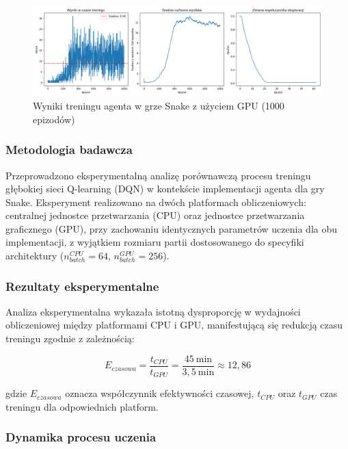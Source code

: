 \documentclass[a4paper,12pt]{article}
\begin{document}
  \begin{figure}[H]
    \centering
    \includegraphics[width=1\linewidth]{1000gierGPU.png}
    \caption{Wyniki treningu agenta w grze Snake z użyciem GPU (1000 epizodów)}
    \label{fig:wyniki_treningu_gpu}
\end{figure}



\subsubsection{Metodologia badawcza}

Przeprowadzono eksperymentalną analizę porównawczą procesu treningu głębokiej sieci Q-learning (DQN) w kontekście implementacji agenta dla gry Snake. Eksperyment realizowano na dwóch platformach obliczeniowych: centralnej jednostce przetwarzania (CPU) oraz jednostce przetwarzania graficznego (GPU), przy zachowaniu identycznych parametrów uczenia dla obu implementacji, z wyjątkiem rozmiaru partii dostosowanego do specyfiki architektury (\(n_{batch}^{CPU} = 64\), \(n_{batch}^{GPU} = 256\)).

\subsubsection{Rezultaty eksperymentalne}


Analiza eksperymentalna wykazała istotną dysproporcję w wydajności obliczeniowej między platformami CPU i GPU, manifestującą się redukcją czasu treningu zgodnie z zależnością:

\begin{equation}
E_{czasowa} = \frac{t_{CPU}}{t_{GPU}} = \frac{45~\text{min}}{3,5~\text{min}} \approx 12,86
\end{equation}

\noindent gdzie \(E_{czasowa}\) oznacza współczynnik efektywności czasowej, \(t_{CPU}\) oraz \(t_{GPU}\) czas treningu dla odpowiednich platform.

\subsubsection{Dynamika procesu uczenia}
\end{document}
